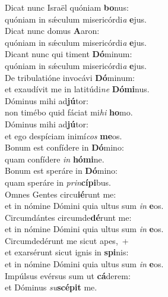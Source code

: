 \evenverse Dicat nunc Israël quóniam \textbf{bo}nus:~\*\\
\evenverse quóniam in sǽculum misericórdi\textit{a} \textbf{e}jus.\\
\oddverse Dicat nunc domus \textbf{A}aron:~\*\\
\oddverse quóniam in sǽculum misericórdi\textit{a} \textbf{e}jus.\\
\evenverse Dicant nunc qui timent \textbf{Dó}minum:~\*\\
\evenverse quóniam in sǽculum misericórdi\textit{a} \textbf{e}jus.\\
\oddverse De tribulatióne invocávi \textbf{Dó}minum:~\*\\
\oddverse et exaudívit me in latitúdi\textit{ne} \textbf{Dó}\textbf{mi}nus.\\
\evenverse Dóminus mihi ad\textbf{jú}tor:~\*\\
\evenverse non timébo quid fáciat mi\textit{hi} \textbf{ho}mo.\\
\oddverse Dóminus mihi ad\textbf{jú}tor:~\*\\
\oddverse et ego despíciam inimí\textit{cos} \textbf{me}os.\\
\evenverse Bonum est confídere in \textbf{Dó}mino:~\*\\
\evenverse quam confídere \textit{in} \textbf{hó}\textbf{mi}ne.\\
\oddverse Bonum est speráre in \textbf{Dó}mino:~\*\\
\oddverse quam speráre in \textit{prin}\textbf{cí}\textbf{pi}bus.\\
\evenverse Omnes Gentes circu\textbf{ié}runt me:~\*\\
\evenverse et in nómine Dómini quia ultus sum \textit{in} \textbf{e}os.\\
\oddverse Circumdántes circumde\textbf{dé}runt me:~\*\\
\oddverse et in nómine Dómini quia ultus sum \textit{in} \textbf{e}os.\\
\evenverse Circumdedérunt me sicut apes,~+\\
\evenverse  et exarsérunt sicut ignis in \textbf{spi}nis:~\*\\
\evenverse et in nómine Dómini quia ultus sum \textit{in} \textbf{e}os.\\
\oddverse Impúlsus evérsus sum ut \textbf{cá}derem:~\*\\
\oddverse et Dóminus \textit{su}\textbf{scé}\textbf{pit} me.\\
